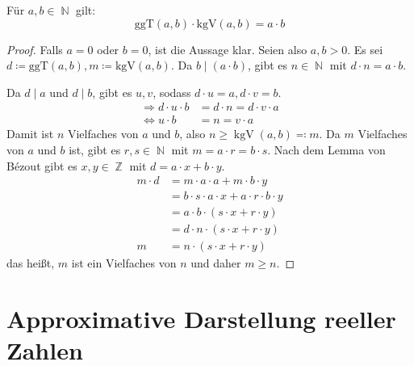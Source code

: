 \documentclass[a4paper,12pt]{article}
\DeclareMathOperator{\N}{\mathbb N}
\DeclareMathOperator{\Z}{\mathbb Z}
\DeclareMathOperator{\kgv}{\text{kgV}}
\theoremstyle{definition}
\begin{document}
	Für $a,b \in \N$ gilt:
	\[
		\text{ggT}(a,b)\cdot \text{kgV}(a,b) = a\cdot b
	\]
	\begin{proof}
		Falls $a = 0$ oder $b = 0$, ist die Aussage klar. Seien also $a,b > 0$. Es sei $d \coloneq \text{ggT}(a,b), m \coloneq \text{kgV}(a,b)$. Da $b \mid (a\cdot b)$, gibt es $n \in \N$ mit $d\cdot n = a\cdot b$.
		
		Da $d \mid a$ und $d \mid b$, gibt es $u,v$, sodass $d\cdot u = a, d\cdot v = b$.
		\begin{align*}
			\Longrightarrow d \cdot u \cdot b &= d \cdot n = d \cdot v \cdot a\\
			\Longleftrightarrow u \cdot b &= n = v \cdot a
		\end{align*}
		Damit ist $n$ Vielfaches von $a$ und $b$, also $n \geq \kgv(a,b) \eqcolon m$. Da $m$ Vielfaches von $a$ und $b$ ist, gibt es $r,s \in \N$ mit $m = a\cdot r = b \cdot s$. Nach dem Lemma von Bézout gibt es $x,y \in \Z$ mit $d = a \cdot x + b \cdot y$.
		\begin{align*}
			m \cdot d &= m \cdot a \cdot a + m \cdot b \cdot y\\
			&= b \cdot s \cdot a \cdot x + a \cdot r \cdot b \cdot y\\
			&= a \cdot b \cdot (s \cdot x + r \cdot y)\\
			&= d \cdot n \cdot (s \cdot x + r \cdot y)\\
			m &= n \cdot (s \cdot x + r \cdot y)
		\end{align*}
		das heißt, $m$ ist ein Vielfaches von $n$ und daher $m \geq n$.
	\end{proof}
	\setcounter{section}{3}
	\section{Approximative Darstellung reeller Zahlen}
\end{document}
